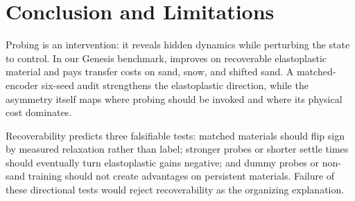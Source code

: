 \section{Conclusion and Limitations}
\label{sec:conclusion}

Probing is an intervention: it reveals hidden dynamics while perturbing the state to control. In our Genesis benchmark, \PTA{} improves on recoverable elastoplastic material and pays transfer costs on sand, snow, and shifted sand. A matched-encoder six-seed audit strengthens the elastoplastic direction, while the asymmetry itself maps where probing should be invoked and where its physical cost dominates.

Recoverability predicts three falsifiable tests: matched materials should flip sign by measured relaxation rather than label; stronger probes or shorter settle times should eventually turn elastoplastic gains negative; and dummy probes or non-sand training should not create advantages on persistent materials. Failure of these directional tests would reject recoverability as the organizing explanation.\label{sec:conclusion:end}
